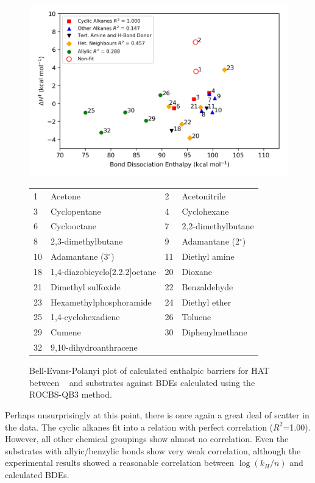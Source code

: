 \begin{figure}[!htbp]
  \centering
  \includegraphics[width=\textwidth]{figures/bep-dG}
\begin{tabularx}{\textwidth}{| l X l X |}
  \hline
  1 & Acetone & 2 & Acetonitrile \\
  3 & Cyclopentane & 4 & Cyclohexane \\
  6 & Cyclooctane & 7 & 2,2-dimethylbutane \\
  8 & 2,3-dimethylbutane & 9 & Adamantane (2$^\circ$) \\
  10 & Adamantane (3$^\circ$) & 11 & Diethyl amine \\
  18 & 1,4-diazobicyclo[2.2.2]octane & 20 & Dioxane \\
  21 & Dimethyl sulfoxide & 22 & Benzaldehyde \\
  23 & Hexamethylphosphoramide & 24 & Diethyl ether \\
  25 & 1,4-cyclohexadiene & 26 & Toluene \\
  29 & Cumene & 30 & Diphenylmethane \\
  32 & 9,10-dihydroanthracene & & \\
  \hline
\end{tabularx}
\caption{Bell-Evans-Polanyi plot of calculated enthalpic barriers for HAT between \cumo~ and substrates against BDEs calculated using the ROCBS-QB3 method.}
\label{fig:bep-dG}
\end{figure}

Perhaps unsurprisingly at this point, there is once again a great deal of scatter in the data. The cyclic alkanes fit into a relation with perfect correlation ($R^2$=1.00). However, all other chemical groupings show almost no correlation. Even the substrates with allyic/benzylic  bonds show very weak correlation, although the experimental results showed a reasonable correlation between $\log(k_H/n)$ and calculated BDEs.


